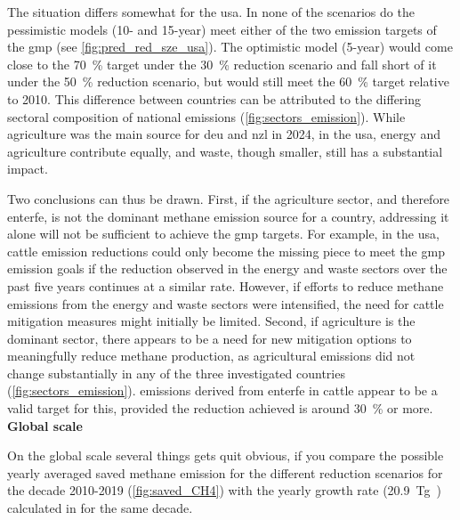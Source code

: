The situation differs somewhat for the \acrshort{usa}. In none of the scenarios do the pessimistic models (10- and 15-year) meet either of the two emission targets of the \acrshort{gmp} (see \cref{fig:pred_red_sze_usa}). The optimistic model (5-year) would come close to the 70~\% target under the 30~\% reduction scenario and fall short of it under the 50~\% reduction scenario, but would still meet the 60~\% target relative to 2010.
This difference between countries can be attributed to the differing sectoral composition of national emissions (\cref{fig:sectors_emission}). While agriculture was the main  source for \acrshort{deu} and \acrshort{nzl} in 2024, in the \acrshort{usa}, energy and agriculture contribute equally, and waste, though smaller, still has a substantial impact.

Two conclusions can thus be drawn. First, if the agriculture sector, and therefore \acrshort{enterfe}, is not the dominant methane emission source for a country, addressing it alone will not be sufficient to achieve the \acrshort{gmp} targets. For example, in the \acrshort{usa}, cattle emission reductions could only become the missing piece to meet the \acrshort{gmp} emission goals if the reduction observed in the energy and waste sectors over the past five years continues at a similar rate. However, if efforts to reduce methane emissions from the energy and waste sectors were intensified, the need for cattle mitigation measures might initially be limited.
Second, if agriculture is the dominant sector, there appears to be a need for new mitigation options to meaningfully reduce methane production, as agricultural emissions did not change substantially in any of the three investigated countries (\cref{fig:sectors_emission}).  emissions derived from \acrlong{enterfe} in cattle appear to be a valid target for this, provided the reduction achieved is around 30~\% or more.\\

\textbf{Global scale}

\noindent On the global scale several things gets quit obvious, if you compare the possible yearly averaged saved methane emission for the different reduction scenarios for the decade 2010-2019 (\cref{fig:saved_CH4}) with the yearly growth rate (20.9~Tg~) calculated in \citet{saunoisGlobalMethaneBudget2025} for the same decade.

